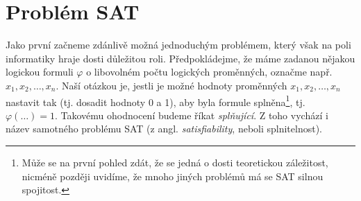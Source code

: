 \section{Problém SAT}\label{sec:sat}

Jako první začneme zdánlivě možná jednoduchým problémem, který však na poli informatiky hraje dosti důležitou roli. Předpokládejme, že máme zadanou nějakou logickou formuli $\varphi$ o libovolném počtu logických proměnných, označme např. $x_1,x_2,\dots,x_n$. Naší otázkou je, jestli je možné hodnoty proměnných $x_1,x_2,\dots,x_n$ nastavit tak (tj. dosadit hodnoty 0 a 1), aby byla formule splněna\footnote{Může se na první pohled zdát, že se jedná o dosti teoretickou záležitost, nicméně později uvidíme, že mnoho jiných problémů má se SAT silnou spojitost.}, tj. $\varphi(\dots)=1$. Takovému ohodnocení budeme říkat \emph{splňující}. Z toho vychází i název samotného problému SAT (z angl. \emph{satisfiability}, neboli splnitelnost).



